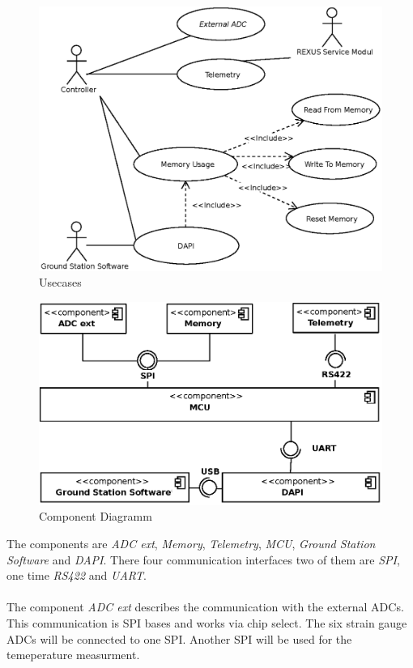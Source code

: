 \begin{figure}[htb]
	\centering
	  \includegraphics{SoftwareDesign/HERMESS_USECASE.eps}
	\caption{Usecases}
	\label{fig:usecase}
\end{figure}
\pagebreak
\begin{figure}[htb]
	\centering
	\includegraphics{SoftwareDesign/Components.eps}
	\caption{Component Diagramm}
\end{figure} \noindent
The components are \textit{ADC ext}, \textit{Memory}, \textit{Telemetry}, \textit{MCU}, \textit{Ground Station Software} and \textit{DAPI}. There four communication interfaces two of them are \textit{SPI}, one time \textit{RS422} and \textit{UART}.\\ \\
The component \textit{ADC ext} describes the communication with the external ADCs. This communication is SPI bases and works via chip select. The six strain gauge ADCs will be connected to one SPI. Another SPI will be used for the temeperature measurment. \\ \\
